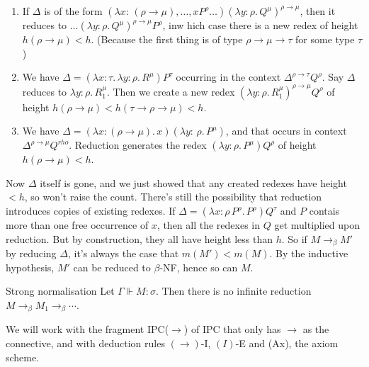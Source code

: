 \documentclass{article}
\numberwithin{thm}{subsection}
\begin{document}
\begin{enumerate}
    \item If $\Delta$ is of the form $(\lambda x:\, (\rho \to \mu), \dots, x P^{\rho} \dots)(\lambda y : \rho.\, Q^{\mu})^{\rho \to \mu}$, then it reduces to $\dots(\lambda y: \rho. \, Q^{\mu})^{\rho \to \mu} P^{\rho}$, inw hich case there is a new redex of height $h(\rho \to \mu)<h$. (Because the first thing is of type $\rho \to \mu \to \tau$ for some type $\tau$)
    \item We have $\Delta = (\lambda x : \tau. \, \lambda y: \rho.\, R^{\mu})P^{\tau}$ occurring in the context $\Delta^{\rho \to \tau}Q^{\rho}$. Say $\Delta$ reduces to $\lambda y : \rho.\, R_{1}^{\mu}$. Then we create a new redex $(\lambda y: \rho.\, R_{1}^{\mu})^{\rho \to \mu}Q^{\rho}$ of height $h(\rho \to \mu) < h(\tau \to \rho \to \mu) < h$.
    \item We have $\Delta = (\lambda x: (\rho \to \mu).\, x)(\lambda y:\, \rho. \, P^{\mu})$, and that occurs in context $\Delta^{\rho \to \mu}Q^{rho}$. Reduction generates the redex $(\lambda y: \rho.\, P^{\mu})Q^{\rho}$ of height $h(\rho \to \mu)<h$.
\end{enumerate}
Now $\Delta$ itself is gone, and we just showed that any created redexes have height $<h$, so won't raise the count. There's still the possibility that reduction introduces copies of existing redexes. If $\Delta = (\lambda x: \rho \, P ^{\rho}.\, P^{\rho})Q^{\tau}$ and $P$ contais more than one free occurrence of $x$, then all the redexes in $Q$ get multiplied upon reduction. But by construction, they all have height less than $h$. \gap So if $M \to_{\beta} M'$ by reducing $\Delta$, it's always the case that $m(M')< m(M)$. By the inductive hypothesis, $M'$ can be reduced to $\beta$-NF, hence so can $M$. \endproof
\begin{fancythm}{Strong normalisation}
    Let $\Gamma \Vdash M : \sigma$. Then there is no infinite reduction $M \to_{\beta} M_{1} \to_{\beta} \cdots$.
\end{fancythm}
We will work with the fragment IPC($\to$) of IPC that only has $\to$ as the connective, and with deduction rules $(\to)$-I, $(I)$-E and (Ax), the axiom scheme.
\end{document}
